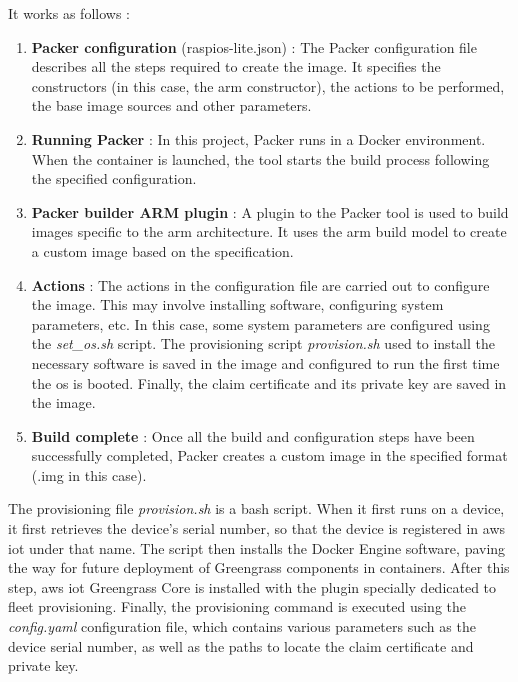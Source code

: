 It works as follows :
\begin{enumerate}
    \item \textbf{Packer configuration} (raspios-lite.json) : The Packer configuration file describes all the steps required to create the image. It specifies the constructors (in this case, the \gls{arm} constructor), the actions to be performed, the base image sources and other parameters.
    \item \textbf{Running Packer} : In this project, Packer runs in a Docker environment. When the container is launched, the tool starts the build process following the specified configuration.
    \item \textbf{Packer builder ARM plugin} : A plugin \cite{packer_plugin} to the Packer tool is used to build images specific to the \gls{arm} architecture. It uses the \gls{arm} build model to create a custom image based on the specification.
    \item \textbf{Actions} : The actions in the configuration file are carried out to configure the image. This may involve installing software, configuring system parameters, etc. In this case, some system parameters are configured using the \textit{set\_os.sh} script. The \gls{provisioning} script \textit{provision.sh} used to install the necessary software is saved in the image and configured to run the first time the \acrshort{os} is booted. Finally, the claim certificate and its private key are saved in the image.
    \item \textbf{Build complete} : Once all the build and configuration steps have been successfully completed, Packer creates a custom image in the specified format (.img in this case).
\end{enumerate}

The \gls{provisioning} file \textit{provision.sh} is a bash script. When it first runs on a device, it first retrieves the device's serial number, so that the device is registered in \gls{aws} \acrshort{iot} under that name. The script then installs the Docker Engine software, paving the way for future deployment of Greengrass components in containers. After this step, \gls{aws} \acrshort{iot} Greengrass Core is installed with the plugin specially dedicated to fleet \gls{provisioning}. Finally, the \gls{provisioning} command is executed using the \textit{config.yaml} configuration file, which contains various parameters such as the device serial number, as well as the paths to locate the claim certificate and private key.

